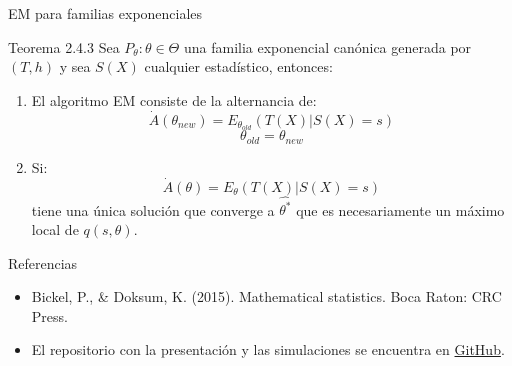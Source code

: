 \documentclass[aspectratio=169,xcolor=dvipsnames]{beamer}
\begin{document}
\begin{frame}{EM para familias exponenciales}
\begin{block}{Teorema 2.4.3}
Sea $P_{\theta}:\theta \in \Theta$ una familia exponencial canónica generada por $(T,h)$ y sea $S(X)$ cualquier estadístico, entonces: 
\begin{enumerate}
    \item El algoritmo EM consiste de la alternancia de:
    $$\dot{A}(\theta_{new})=E_{\theta_{old}}(T(X)|S(X)=s)$$
    $$\theta_{old}=\theta_{new}$$
    \item Si:
    $$\dot{A}(\theta)=E_{\theta}(T(X)|S(X)=s)$$
    tiene una única solución que converge a $\hat{\theta^{*}}$ que es necesariamente un máximo local de $q(s,\theta)$.
    \end{enumerate}
\end{block}
\end{frame}

\begin{frame}{Referencias}
\begin{itemize}
    \item Bickel, P., & Doksum, K. (2015). Mathematical statistics. Boca Raton: CRC Press.
    \item El repositorio con la presentación y las simulaciones se encuentra en \href{https://github.com/nriverag/Insumos-de-estimacion}{GitHub}.
\end{itemize}
\end{frame}

\end{document}
